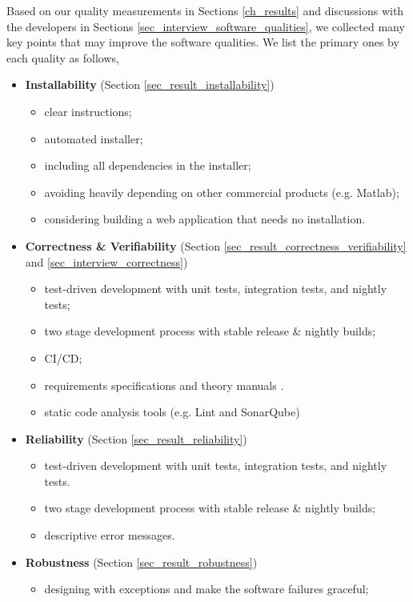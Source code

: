 \documentclass[preprint,12pt,authoryear]{elsarticle}
\begin{document}
Based on our quality measurements in Sections \ref{ch_results} and discussions
with the developers in Sections \ref{sec_interview_software_qualities}, we
collected many key points that may improve the software qualities. We list the
primary ones by each quality as follows,
\begin{itemize}
\item \textbf{Installability} (Section \ref{sec_result_installability})
\begin{itemize}
    \item clear instructions;
    \item automated installer;
    \item including all dependencies in the installer;
    \item avoiding heavily depending on other commercial products (e.g. Matlab);
    \item considering building a web application that needs no installation.
\end{itemize}
\item \textbf{Correctness \& Verifiability} (Section \ref{sec_result_correctness_verifiability} and \ref{sec_interview_correctness})
\begin{itemize}
    \item test-driven development with unit tests, integration tests, and nightly tests;
    \item two stage development process with stable release \& nightly builds;
    \item CI/CD;
    \item requirements specifications and theory manuals \citep{Smith2016} \citep{SmithAndLai2005}.
    \item static code analysis tools (e.g. Lint and SonarQube)
\end{itemize}
\item \textbf{Reliability} (Section \ref{sec_result_reliability})
\begin{itemize}
    \item test-driven development with unit tests, integration tests, and nightly tests.
    \item two stage development process with stable release \& nightly builds;
    \item descriptive error messages.
\end{itemize}
\item \textbf{Robustness} (Section \ref{sec_result_robustness})
\begin{itemize}
    \item designing with exceptions and make the software failures graceful;

\end{itemize}
\end{itemize}
\end{document}
